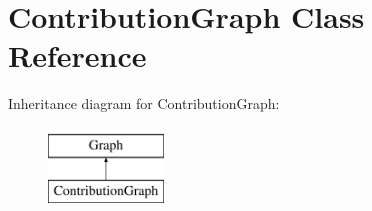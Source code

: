 \hypertarget{classContributionGraph}{
\section{ContributionGraph Class Reference}
\label{classContributionGraph}
}
Inheritance diagram for ContributionGraph:\begin{figure}[H]
\begin{center}
\leavevmode
\includegraphics[height=2.000000cm]{classContributionGraph}
\end{center}
\end{figure}
